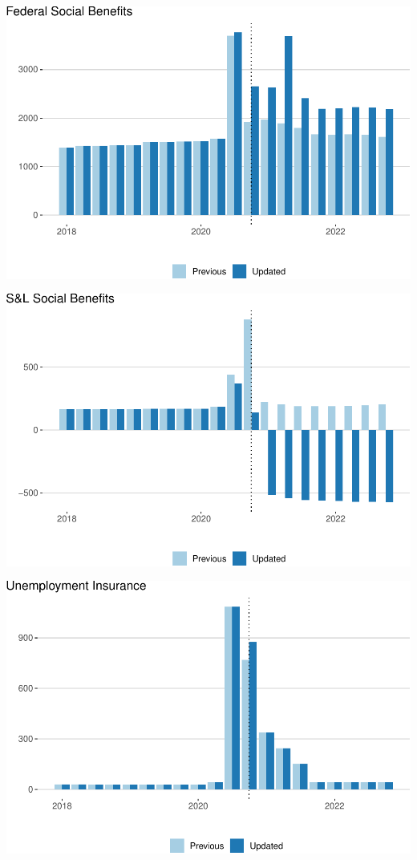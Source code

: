 \documentclass[
]{article}
\begin{document}
\begin{center}\includegraphics{update-changes-levels_files/figure-latex/federal-social-benefits-1} \end{center}

\begin{center}\includegraphics{update-changes-levels_files/figure-latex/state-social-benefits-1} \end{center}

\begin{center}\includegraphics{update-changes-levels_files/figure-latex/unemployment_insurance-1} \end{center}
\end{document}
